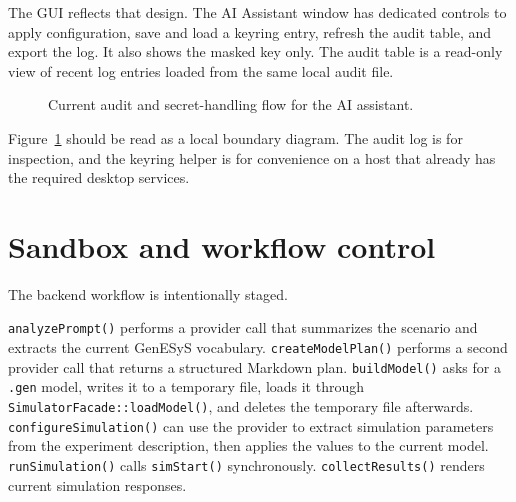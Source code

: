 The GUI reflects that design. The AI Assistant window has dedicated controls to apply configuration, save and load a keyring entry, refresh the audit table, and export the log. It also shows the masked key only. The audit table is a read-only view of recent log entries loaded from the same local audit file.

\begin{figure}[htbp]
\centering
\caption{Current audit and secret-handling flow for the AI assistant.}
\label{fig:ai-audit-flow}
\end{figure}

Figure~\ref{fig:ai-audit-flow} should be read as a local boundary diagram. The audit log is for inspection, and the keyring helper is for convenience on a host that already has the required desktop services.

\section{Sandbox and workflow control}
\label{sec:ai-sandbox-workflow}

The backend workflow is intentionally staged.

\texttt{analyzePrompt()} performs a provider call that summarizes the scenario and extracts the current GenESyS vocabulary. \texttt{createModelPlan()} performs a second provider call that returns a structured Markdown plan. \texttt{buildModel()} asks for a \texttt{.gen} model, writes it to a temporary file, loads it through \texttt{SimulatorFacade::loadModel()}, and deletes the temporary file afterwards. \texttt{configureSimulation()} can use the provider to extract simulation parameters from the experiment description, then applies the values to the current model. \texttt{runSimulation()} calls \texttt{simStart()} synchronously. \texttt{collectResults()} renders current simulation responses.

